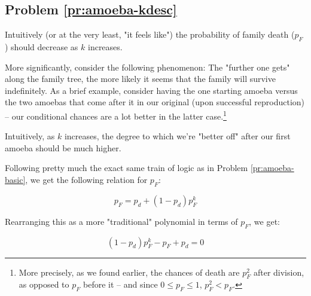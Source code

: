 
\subsection{Problem \ref{pr:amoeba-kdesc}}

Intuitively (or at the very least, "it feels like") the probability of family death ($p_F$) should decrease as $k$ increases.

More significantly, consider the following phenomenon: The "further one gets" along the family tree, the more likely it seems that the family will survive indefinitely. As a brief example, consider having the one starting amoeba versus the two amoebas that come after it in our original (upon successful reproduction) -- our conditional chances are a lot better in the latter case.\footnote{More precisely, as we found earlier, the chances of death are $p_F^2$ after division, as opposed to $p_F$ before it -- and since $0 \leq p_F \leq 1$, $p_F^2 < p_F$.}

Intuitively, as $k$ increases, the degree to which we're "better off" after our first amoeba should be much higher. 


Following pretty much the exact same train of logic as in Problem \ref{pr:amoeba-basic}, we get the following relation for $p_F$:

\begin{equation}
p_F = p_d + (1-p_d)p_F^k
\end{equation}

Rearranging this as a more "traditional" polynomial in terms of $p_F$, we get:

\begin{equation}
(1-p_d)p_F^k - p_F + p_d = 0
\end{equation}





